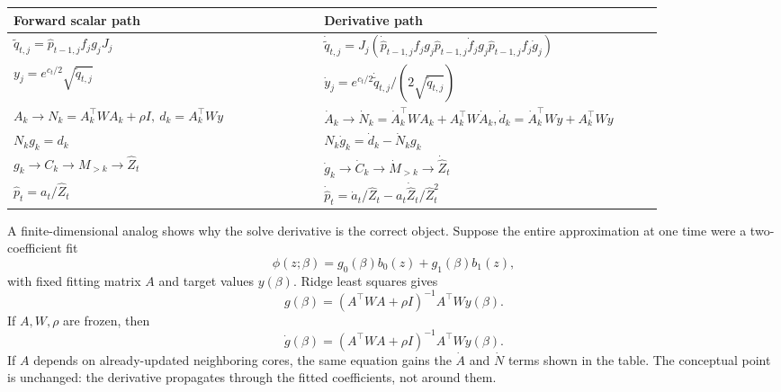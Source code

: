 \documentclass[11pt]{article}
\numberwithin{equation}{section}
\begin{document}
\begin{center}
\begin{tabular}{p{0.42\linewidth}p{0.42\linewidth}}
\toprule
Forward scalar path & Derivative path\\
\midrule
\(\widetilde q_{t,j}
=\widehat p_{t-1,j} f_j g_jJ_j\) &
\(\dot{\widetilde q}_{t,j}
=J_j(\dot{\widehat p}_{t-1,j}f_jg_j
\widehat p_{t-1,j}\dot f_jg_j
\widehat p_{t-1,j}f_j\dot g_j)\)\\
\(y_j=e^{c_t/2}\sqrt{\widetilde q_{t,j}}\) &
\(\dot y_j=e^{c_t/2}\dot{\widetilde q}_{t,j}/(2\sqrt{\widetilde q_{t,j}})\)\\
\(A_k\to N_k=A_k^\top W A_k+\rho I,\ d_k=A_k^\top Wy\) &
\(\dot A_k\to \dot N_k=\dot A_k^\top WA_k+A_k^\top W\dot A_k,
\dot d_k=\dot A_k^\top Wy+A_k^\top W\dot y\)\\
\(N_kg_k=d_k\) &
\(N_k\dot g_k=\dot d_k-\dot N_kg_k\)\\
\(g_k\to C_k\to M_{>k}\to\widehat Z_t\) &
\(\dot g_k\to\dot C_k\to\dot M_{>k}\to\dot{\widehat Z}_t\)\\
\(\widehat p_t=a_t/\widehat Z_t\) &
\(\dot{\widehat p}_t=\dot a_t/\widehat Z_t-a_t\dot{\widehat Z}_t/\widehat Z_t^2\)\\
\bottomrule
\end{tabular}
\end{center}

A finite-dimensional analog shows why the solve derivative is the correct
object.  Suppose the entire approximation at one time were a two-coefficient
fit
\begin{equation}
    \phi(z;\beta)=g_0(\beta)b_0(z)+g_1(\beta)b_1(z),
    \label{eq:p25-gradteach-7}
\end{equation}
with fixed fitting matrix \(A\) and target values \(y(\beta)\).  Ridge least
squares gives
\begin{equation}
    g(\beta)
    =
    (A^\top W A+\rho I)^{-1}A^\top W y(\beta).
    \label{eq:p25-gradteach-8}
\end{equation}
If \(A,W,\rho\) are frozen, then
\begin{equation}
    \dot g(\beta)
    =
    (A^\top W A+\rho I)^{-1}A^\top W\dot y(\beta).
    \label{eq:p25-gradteach-9}
\end{equation}
If \(A\) depends on already-updated neighboring cores, the same equation gains
the \(\dot A\) and \(\dot N\) terms shown in the table.  The conceptual point is
unchanged: the derivative propagates through the fitted coefficients, not
around them.
\end{document}
